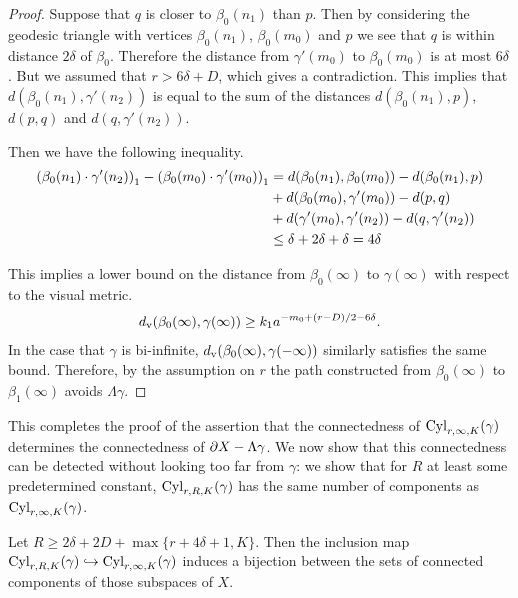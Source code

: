 \begin{proof}
  Suppose that $q$ is closer to $\beta_0(n_1)$ than $p$. 
  Then by considering the geodesic triangle with vertices $\beta_0(n_1)$, $\beta_0(m_0)$ and $p$ we see that $q$ is within distance $2\delta$ of $\beta_0$. 
  Therefore the distance from $\gamma'(m_0)$ to $\beta_0(m_0)$ is at most $6\delta$. 
  But we assumed that $r > 6\delta + D$, which gives a contradiction. 
  This implies that $d(\beta_0(n_1), \gamma'(n_2))$ is equal to the sum of the distances $d(\beta_0(n_1), p)$, $d(p, q)$ and $d(q, \gamma'(n_2))$.

  Then we have the following inequality.
  \begin{align} \gromprod[1]{\beta_0(n_1)}{\gamma'(n_2)} - \gromprod[1]{\beta_0(m_0)
      }{\gamma'(m_0)} 
      & = d(\beta_0(n_1), \beta_0(m_0)) - d(\beta_0(n_1), p) \\
      & + d(\beta_0(m_0), \gamma'(m_0)) - d(p, q) \\
      & + d(\gamma'(m_0), \gamma'(n_2)) - d(q, \gamma'(n_2))\\
      & \leq \delta + 2\delta + \delta = 4\delta
  \end{align}

  This implies a lower bound on the distance from $\beta_0(\infty)$ to $\gamma(\infty)$ with respect to the visual metric.
  \begin{align}
    d_\rmv(\beta_0(\infty), \gamma(\infty)) \geq k_1a^{-m_0 + (r-D)/2 - 6\delta}.
  \end{align}
  In the case that $\gamma$ is bi-infinite, $d_\rmv(\beta_0(\infty), \gamma(-\infty))$ similarly satisfies the same bound.  
  Therefore, by the assumption on $r$ the path constructed from $\beta_0(\infty)$ to $\beta_1(\infty)$ avoids $\Lambda\gamma$.
\end{proof}

This completes the proof of the assertion that the connectedness of $\Cyl_{r, \infty, K}(\gamma)$ determines the connectedness of $\boundary X - \Lambda \gamma$.
We now show that this connectedness can be detected without looking too far from $\gamma$: we show that for $R$ at least some predetermined constant, $\Cyl_{r, R, K}(\gamma)$ has the same number of components as $\Cyl_{r, \infty, K}(\gamma)$.

\begin{proposition}\label{proposition:replace_infinity_by_R} 
  Let $R \geq 2\delta + 2D + \max\{r + 4\delta + 1, K\}$.
  Then the inclusion map $\Cyl_{r, R, K}(\gamma) \hookrightarrow \Cyl_{r, \infty, K}(\gamma)$ induces a bijection between the sets of connected components of those subspaces of $X$.
\end{proposition}

